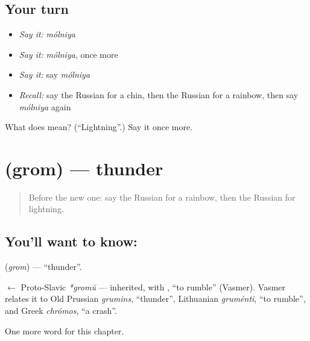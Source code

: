 \subsection*{Your turn}
\begin{itemize}
\raggedright
  \item \emph{Say it:} \emph{mólniya}
  \item \emph{Say it:} \emph{mólniya}, once more
  \item \emph{Say it:} say \emph{mólniya}
  \item \emph{Recall:} say the Russian for a chin, then the Russian for a rainbow, then say \emph{mólniya} again
\end{itemize}

\begin{tcolorbox}[breakable,colback=teal!4,colframe=teal!35!black,title={Before you move on}]
What does  mean? (\textquotedblleft{}Lightning\textquotedblright{}.) Say it once more.
\end{tcolorbox}
\section[\texorpdfstring{\ru{гром} (grom)}{гром (grom)}]{ (grom) — thunder}

\label{lesson:RU-C122-thunder}



\begin{quote}
Before the new one: say the Russian for a rainbow, then the Russian for lightning.
\end{quote}

\subsection*{You'll want to know: }
\textbf{} (\emph{grom}) — \textquotedblleft{}thunder\textquotedblright{}.

\begin{cousinweb}
\textbf{} $\leftarrow$ Proto-Slavic \emph{*gromŭ} — inherited, with \emph{}, \textquotedblleft{}to rumble\textquotedblright{} (Vasmer). Vasmer relates it to Old Prussian \emph{grumins}, \textquotedblleft{}thunder\textquotedblright{}, Lithuanian \emph{gruménti}, \textquotedblleft{}to rumble\textquotedblright{}, and Greek \emph{chrómos}, \textquotedblleft{}a crash\textquotedblright{}.
\end{cousinweb}

\begin{grammarlens}[title={What you've built}]
One more word for this chapter.
\end{grammarlens}

